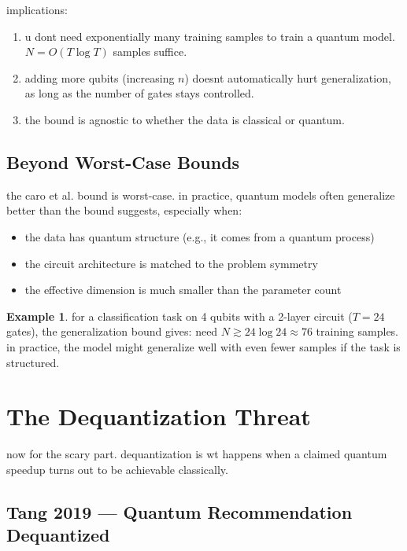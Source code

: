 \documentclass[11pt,a4paper]{article}
\theoremstyle{definition}
\newtheorem{example}{Example}[section]
\theoremstyle{remark}
\begin{document}
implications:
\begin{enumerate}[label=\arabic*.]
    \item u dont need exponentially many training samples to train a quantum model. $N = O(T \log T)$ samples suffice.
    \item adding more qubits (increasing $n$) doesnt automatically hurt generalization, as long as the number of gates stays controlled.
    \item the bound is agnostic to whether the data is classical or quantum.
\end{enumerate}

\subsection{Beyond Worst-Case Bounds}

the caro et al. bound is worst-case. in practice, quantum models often generalize better than the bound suggests, especially when:
\begin{itemize}[nosep]
    \item the data has quantum structure (e.g., it comes from a quantum process)
    \item the circuit architecture is matched to the problem symmetry
    \item the effective dimension is much smaller than the parameter count
\end{itemize}

\begin{example}
for a classification task on 4 qubits with a 2-layer circuit ($T = 24$ gates), the generalization bound gives: need $N \gtrsim 24 \log 24 \approx 76$ training samples. in practice, the model might generalize well with even fewer samples if the task is structured.
\end{example}

\section{The Dequantization Threat}

now for the scary part. dequantization is wt happens when a claimed quantum speedup turns out to be achievable classically.

\subsection{Tang 2019 --- Quantum Recommendation Dequantized}
\end{document}
